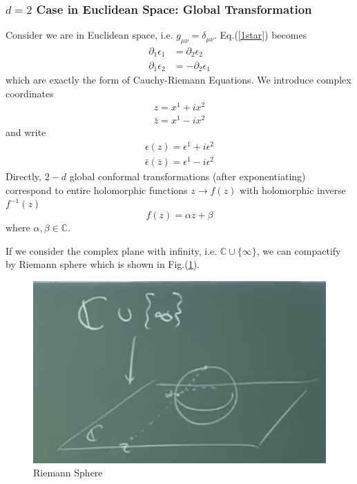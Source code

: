 \documentclass[a4paper,11pt]{article}
\begin{document}
\subsubsection{$d=2$ Case in Euclidean Space: Global Transformation}
Consider we are in Euclidean space, i.e. $g_{\mu\nu}=\delta_{\mu\nu}$. Eq.(\ref{1star}) becomes
\begin{equation}
\begin{aligned}
\partial_1\epsilon_1&=\partial_2\epsilon_2\\
\partial_1\epsilon_2&=-\partial_2\epsilon_1
\end{aligned}
\end{equation}
which are exactly the form of Cauchy-Riemann Equations. We introduce complex coordinates
\begin{equation}
\begin{aligned}
z=x^1+ix^2\\
\bar{z}=x^1-ix^2
\end{aligned}
\end{equation}
and write
\begin{equation}
\begin{aligned}
\epsilon(z)=\epsilon^1+i\epsilon^2\\
\bar{\epsilon}(\bar{z})=\epsilon^1-i\epsilon^2
\end{aligned}
\end{equation}
Directly, $2-d$ global conformal transformations (after exponentiating) correspond to entire holomorphic functions $z\rightarrow f(z)$ with holomorphic inverse $f^{-1}(z)$
\begin{equation}
    f(z)=\alpha z+\beta
\end{equation}
where $\alpha,\beta\in \mathbb{C}$.

If we consider the complex plane with infinity, i.e. $\mathbb{C}\cup\{\infty\}$, we can compactify by Riemann sphere which is shown in Fig.(\ref{RiemannSphere}).
\begin{figure}
    \centering
    \includegraphics[scale=0.5]{RiemannSphere.jpg}
    \caption{Riemann Sphere}
    \label{RiemannSphere}
\end{figure}
\end{document}
